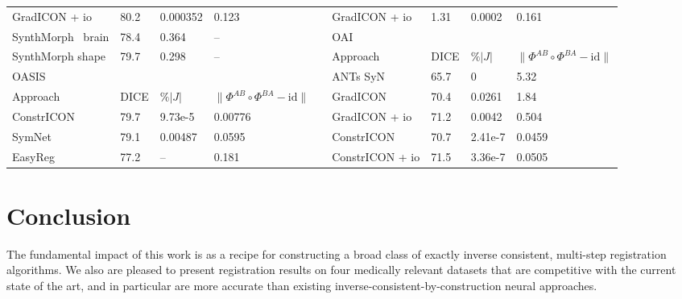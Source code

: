 \begin{table}
{\begin{tabular}{|l|l|l|l|l|l|l|l|l|}
			GradICON + io                                 & 80.2                 & 0.000352             & 0.123                                         &  & GradICON + io                         & 1.31  & 0.0002    & 0.161                                         \\ \cline{6-9} 
			SynthMorph~\cite{hoffmann2022synthmorph} brain & 78.4                 & 0.364                & --                                            &  & OAI                                                                                                      \\ \cline{6-9}
			SynthMorph shape                              & 79.7                 & 0.298                & --                                            &  & Approach                              & DICE & $ \% |J|$ & $\|\Phi^{AB} \circ \Phi^{BA} - \textrm{id}\|$ \\ \cline{6-9} \cline{1-4}
			OASIS                                         & \multicolumn{1}{c}{} & \multicolumn{1}{c}{} & \multicolumn{1}{c}{}                          &  & ANTs SyN                              & 65.7 & 0         & 5.32                                          \\ \cline{1-4}
			Approach                                      & DICE                 & $ \% |J|$            & $\|\Phi^{AB} \circ \Phi^{BA} - \textrm{id}\|$ &  & GradICON                              & 70.4 & 0.0261    & 1.84                                          \\ \cline{1-4}
			ConstrICON                                    & 79.7                 & 9.73e-5              & 0.00776                                       &  & GradICON + io                         & 71.2 & 0.0042    & 0.504                                         \\ 
			SymNet~\cite{Mok_2020_CVPR}                   & 79.1                 & 0.00487              & 0.0595                                        &  & ConstrICON                            & 70.7 & 2.41e-7   & 0.0459                                        \\
			EasyReg~\cite{iglesias2023easyreg}            & 77.2                 & --                   & 0.181                                         &  & ConstrICON + io                       & 71.5 & 3.36e-7   & 0.0505                                        \\ \cline{1-4} \cline{6-9} 
		\end{tabular}
	}
\end{table}
\section{Conclusion}
The fundamental impact of this work is as a recipe for constructing a broad
class of exactly inverse consistent, multi-step registration algorithms. We
also are pleased to present registration results on four medically relevant
datasets that are competitive with the current state of the art, and in
particular are more accurate than existing inverse-consistent-by-construction
neural approaches.

